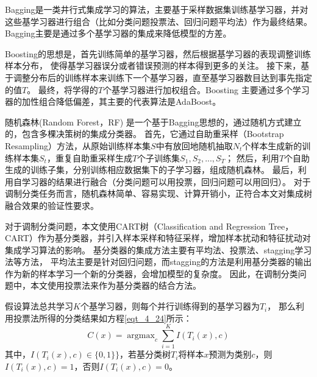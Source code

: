Bagging\cite{breiman1996bagging}是一类井行式集成学习的算法，主要基于采样数据集训练基学习器，并对这些基学习器进行组合（比如分类问题投票法、回归问题平均法）作为最终结果。Bagging主要是通过多个基学习器的集成来降低模型的方差。

Boosting\cite{freund1999short}的思想是，首先训练简单的基学习器，然后根据基学习器的表现调整训练样本分布，
使得基学习器误分或者错误预测的样本得到更多的关注。
接下来，基于调整分布后的训练样本来训练下一个基学习器，直至基学习器数目达到事先指定的值$T$。
最终，将学得的$T$个基学习器进行加权组合。Boosting 主要通过多个学习器的加性组合降低偏差，其主要的代表算法是AdaBoost\cite{freund1996experiments}。\par

随机森林(Random Forest，RF) \cite{liaw2002classification}是一个基于Bagging思想的，通过随机方式建立的，包含多棵决策树的集成分类器。
首先，它通过自助重采样（Bootstrap Resampling）方法，从原始训练样本集$S$中有放回地随机抽取$N_t$个样本生成新的训练样本集$S_t$，重复自助重采样生成$T$个子训练集${S_1, S_2, ..., S_T}$；
然后，利用$T$个自助生成的训练子集，分别训练相应数据集下的子学习器，组成随机森林。
最后，利用自学习器的结果进行融合（分类问题可以用投票，回归问题可以用回归）。
对于调制分类任务而言，随机森林简单、容易实现、计算开销小，正符合本文对集成树融合效果的验证性要求。\par

对于调制分类问题，本文使用CART树（Classification and Regression Tree，CART）\cite{Breiman2015Classification}作为基分类器，并引入样本采样和特征采样，增加样本扰动和特征扰动对集成学习算法的影响。
基分类器的集成方法主要有平均法、投票法、stagging学习法等方法，
平均法主要是针对回归问题，而stagging的方法是利用基分类器的输出作为新的样本学习一个新的分类器，会增加模型的复杂度。
因此，在调制分类问题中，本文使用投票法来作为基分类器的结合方法。\par

假设算法总共学习$K$个基学习器，则每个并行训练得到的基学习器为$T_{i}$，
那么利用投票法所得的分类结果如方程\eqref{eqt_4_24}所示：
\begin{equation}
	\label{eqt_4_24}
	C(x) = \mathop{\arg\max}_{c} \sum_{i=1}^{K} I(T_i(x), c)
\end{equation}
其中，$I(T_i(x), c) \in \{0, 1\}\}$，若基分类树$T_{i}$将样本$x$预测为类别$c$，则$I(T_i(x), c)=1$，否则$I(T_i(x), c)=0$。\par

